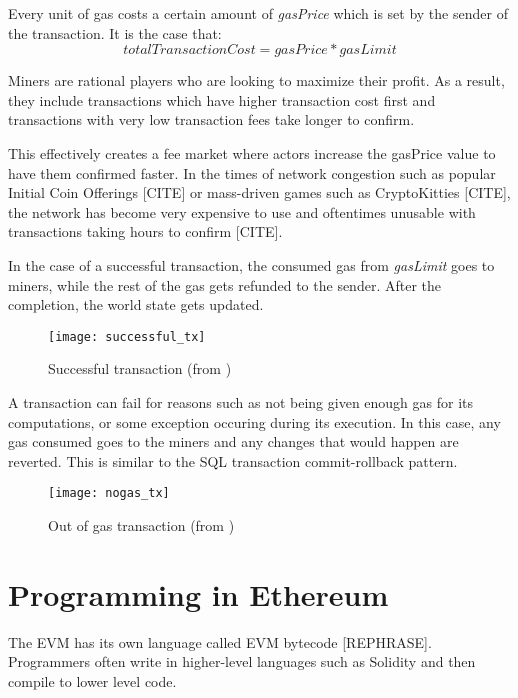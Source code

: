 Every unit of gas costs a certain amount of \textit{gasPrice} which is set by the sender of the transaction. 
It is the case that:
\begin{equation}
    totalTransactionCost = gasPrice * gasLimit
\end{equation}

Miners are rational players who are looking to maximize their profit. As a result, they include transactions which have higher transaction cost first and transactions with very low transaction fees take longer to confirm.

This effectively creates a fee market  where actors increase the gasPrice value to have them confirmed faster. In the times of network congestion such as popular Initial Coin Offerings [CITE] or mass-driven games such as CryptoKitties [CITE], the network has become very expensive to use and oftentimes unusable with transactions taking hours to confirm [CITE]. 

In the case of a successful transaction, the consumed gas from \textit{gasLimit} goes to miners, while the rest of the gas gets refunded to the sender. After the completion, the world state gets updated.

\begin{figure}[H]
    \centering
    \texttt{[image: successful\_tx]}
    \caption{Successful transaction (from \cite{preethi})}
    \label{successful_tx}
\end{figure}

A transaction can fail for reasons such as not being given enough gas for its computations, or some exception occuring during its execution. In this case, any gas consumed goes to the miners and any changes that would happen are reverted. This is similar to the SQL transaction commit-rollback pattern.

\begin{figure}[H]
    \centering
    \texttt{[image: nogas\_tx]}
    \caption{Out of gas transaction (from \cite{preethi})}
    \label{nogas_tx}
\end{figure}


\section{Programming in Ethereum}
The EVM has its own language called EVM bytecode [REPHRASE]. Programmers often write in higher-level languages such as Solidity and then compile to lower level code. 

